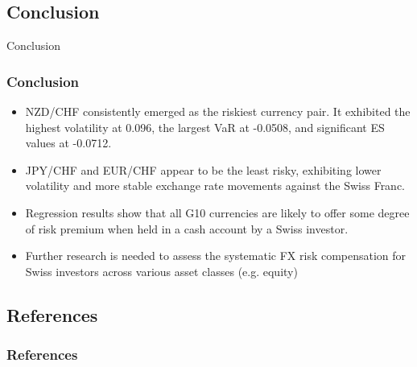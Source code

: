 \documentclass[10pt]{beamer}
\begin{document}
\begin{frame}
\section{Conclusion}
\centering \LARGE Conclusion
\end{frame}
\begin{frame}
\frametitle{Conclusion}
\begin{itemize}
    \item NZD/CHF consistently emerged as the riskiest currency pair. It exhibited the highest volatility at 0.096, the largest VaR at -0.0508, and significant ES values at -0.0712.
    \item JPY/CHF and EUR/CHF appear to be the least risky, exhibiting lower volatility and more stable exchange rate movements against the Swiss Franc. 
    \item Regression results show that all G10 currencies are likely to offer some degree of risk premium when held in a cash account by a Swiss investor.
    \item Further research is needed to assess the systematic FX risk compensation for Swiss investors across various asset classes (e.g. equity)
\end{itemize}
\end{frame}
\begin{frame}
\section{References}
\frametitle{References}
\printbibliography
\end{frame}
\end{document}
